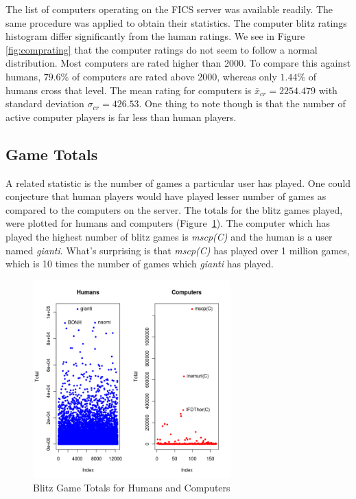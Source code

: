 \documentclass{article}
\begin{document}
The list of computers operating on the FICS server was available readily. The same procedure was applied to obtain their statistics. The computer blitz ratings histogram differ significantly from the human ratings. We see in Figure \ref{fig:comprating} that the computer ratings do not seem to follow a normal distribution. Most computers are rated higher than 2000. To compare this against humans, $79.6\%$ of computers are rated above 2000, whereas only $1.44\%$ of humans cross that level. The mean rating for computers is $\bar{x}_{cr} = 2254.479$ with standard deviation $\sigma_{cr} = 426.53$. One thing to note though is that the number of active computer players is far less than human players.\\



\subsection{Game Totals}

A related statistic is the number of games a particular user has played. One could conjecture that human players would have played lesser number of games as compared to the computers on the server. The totals for the blitz games played, were plotted for humans and computers (Figure~\ref{fig:gametotals}). The computer which has played the highest number of blitz games is {\sl mscp(C)} and the human is a user named {\sl gianti}. What's surprising is that {\sl mscp(C)} has played over 1 million games, which is 10 times the number of games which {\sl gianti} has played.\\


\begin{figure} [htp]
\begin{center}
\includegraphics[width=3in]{game_totals.png}
\end{center}
\caption{Blitz Game Totals for Humans and Computers}
\label{fig:gametotals}
\end{figure}
\end{document}
